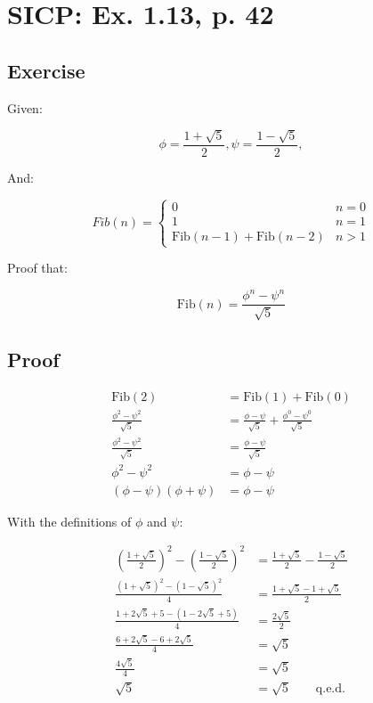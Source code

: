 \documentclass[a4paper]{scrartcl}
\begin{document}
\setlength\parindent{0pt}

\section*{SICP: Ex. 1.13, p. 42}

\subsection*{Exercise}

Given:

$$
\phi = \frac{1 + \sqrt{5}}{2},
\psi = \frac{1 - \sqrt{5}}{2},
$$

And:

$$
Fib(n) = 
\left\{
    \begin{array}{lll}
        0 & n = 0 \\
        1 & n = 1 \\
        \text{Fib}(n-1) + \text{Fib}(n-2) & n > 1
    \end{array}
\right.
$$

Proof that:

$$ \text{Fib}(n) = \frac{\phi^n-\psi^n}{\sqrt{5}} $$

\subsection*{Proof}

\begin{align}
    \text{Fib}(2) & = \text{Fib}(1) + \text{Fib}(0) \\
    \frac{\phi^2-\psi^2}{\sqrt{5}} & = \frac{\phi-\psi}{\sqrt{5}} + \frac{\phi^0-\psi^0}{\sqrt{5}} \\
    \frac{\phi^2-\psi^2}{\sqrt{5}} & = \frac{\phi-\psi}{\sqrt{5}} \\
    \phi^2 - \psi^2 & = \phi - \psi \\
    (\phi - \psi)(\phi + \psi) & = \phi - \psi
\end{align}

With the definitions of $\phi$ and $\psi$:

\begin{align}
    \left(\frac{1+\sqrt{5}}{2}\right)^2 - \left(\frac{1-\sqrt{5}}{2}\right)^2 & =  \frac{1+\sqrt{5}}{2} - \frac{1-\sqrt{5}}{2} \\
    \frac{(1+\sqrt{5})^2 - (1-\sqrt{5})^2}{4} & = \frac{1+\sqrt{5}-1+\sqrt{5}}{2} \\
    \frac{1+2\sqrt{5}+5-(1-2\sqrt{5}+5)}{4} & = \frac{2\sqrt{5}}{2} \\
    \frac{6 + 2\sqrt{5} - 6 + 2\sqrt{5}}{4} & = \sqrt{5} \\
    \frac{4\sqrt{5}}{4} & = \sqrt{5} \\
    \sqrt{5} & = \sqrt{5} \qquad \text{q.e.d.}
\end{align}
\end{document}
